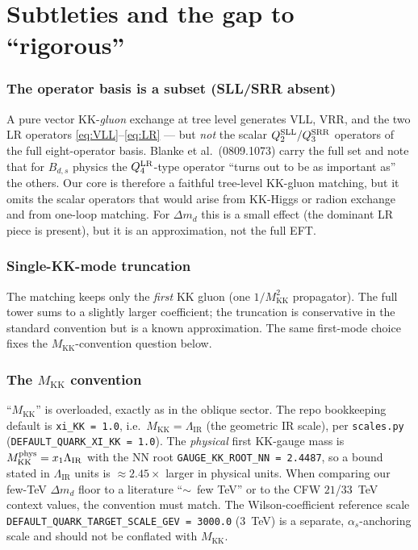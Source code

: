 \documentclass[11pt]{article}
\newcommand{\MKK}{M_{\mathrm{KK}}}
\newcommand{\LIR}{\Lambda_{\mathrm{IR}}}
\newcommand{\dmd}{\Delta m_d}
\newcommand{\code}[1]{\texttt{#1}}
\theoremstyle{definition}
\begin{document}
\part{Subtleties and the gap to ``rigorous''}
\label{part:subtle}

\section{The operator basis is a subset (SLL/SRR absent)}
\label{sec:gap}
A pure vector KK-\emph{gluon} exchange at tree level generates VLL, VRR, and the
two LR operators \eqref{eq:VLL}--\eqref{eq:LR} --- but \emph{not} the scalar
$Q_2^{\rm SLL}/Q_3^{\rm SRR}$ operators of the full eight-operator basis. Blanke
et al.\ (0809.1073) carry the full set and note that for $B_{d,s}$ physics the
$Q_4^{\rm LR}$-type operator ``turns out to be as important as'' the others. Our
core is therefore a faithful tree-level KK-gluon matching, but it omits the
scalar operators that would arise from KK-Higgs or radion exchange and from
one-loop matching. For $\dmd$ this is a small effect (the dominant LR piece is
present), but it is an approximation, not the full EFT.

\section{Single-KK-mode truncation}
The matching keeps only the \emph{first} KK gluon (one $1/\MKK^2$ propagator). The
full tower sums to a slightly larger coefficient; the truncation is conservative
in the standard convention but is a known approximation. The same first-mode
choice fixes the $\MKK$-convention question below.

\section{The $\MKK$ convention}
\label{sec:Mconvention}
``$\MKK$'' is overloaded, exactly as in the oblique sector. The repo bookkeeping
default is \code{xi\_KK = 1.0}, i.e.\ $\MKK=\LIR$ (the geometric IR scale), per
\code{scales.py} (\code{DEFAULT\_QUARK\_XI\_KK = 1.0}). The \emph{physical} first
KK-gauge mass is $\MKK^{\rm phys}=x_1\LIR$ with the NN root
\code{GAUGE\_KK\_ROOT\_NN = 2.4487}, so a bound stated in $\LIR$ units is
$\approx2.45\times$ larger in physical units. When comparing our few-TeV $\dmd$
floor to a literature ``$\sim$~few TeV'' or to the CFW $21$/$33$~TeV context
values, the convention must match. The Wilson-coefficient reference scale
\code{DEFAULT\_QUARK\_TARGET\_SCALE\_GEV = 3000.0} (3~TeV) is a separate,
$\alpha_s$-anchoring scale and should not be conflated with $\MKK$.
\end{document}
